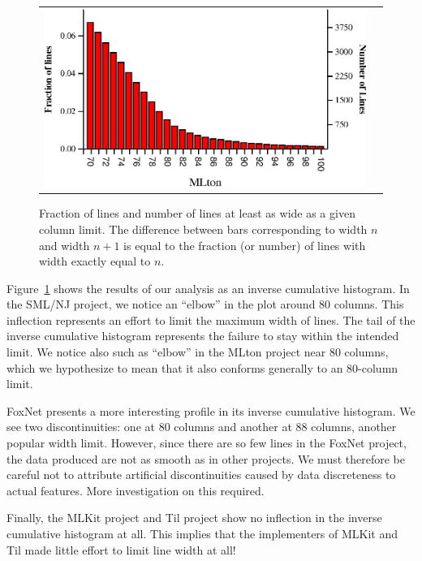 \documentclass[12pt,abstracton]{scrartcl}
\begin{document}
\begin{figure}[h!]
\begin{tabular}{cc}
\includegraphics[scale=0.68]{mlton.eps} &
\end{tabular}
\caption{Fraction of lines and number of lines at least as wide as a given column limit. The difference between bars corresponding to width $n$ and width $n+1$ is
equal to the fraction (or number) of lines with width exactly equal to $n$.}
\label{fig:width}
\end{figure}

Figure~\ref{fig:width} shows the results of our analysis
as an inverse cumulative histogram.
In the SML/NJ project,
we notice an ``elbow'' in the plot around 80 columns. This inflection represents
an effort to limit the maximum width of lines. The tail of the inverse cumulative
histogram represents the failure to stay within the intended limit. We notice
also such as ``elbow'' in the MLton project near 80 columns, which we hypothesize
to mean that it also conforms generally to an 80-column limit.

FoxNet presents a more interesting profile in its inverse cumulative histogram. We see
two discontinuities: one at 80 columns and another at 88 columns, another popular width limit.
However, since there are so few lines in the FoxNet project, the data produced are
not as smooth as in other projects. We must therefore be careful not to attribute
artificial discontinuities caused by data discreteness to actual features. More
investigation on this required.

Finally, the MLKit project and Til project show no inflection in the
inverse cumulative histogram at all. This implies that the implementers of MLKit
and Til made little effort to limit line width at all!
\end{document}
